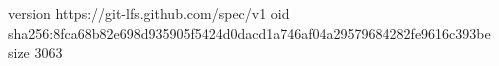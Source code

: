 version https://git-lfs.github.com/spec/v1
oid sha256:8fca68b82e698d935905f5424d0dacd1a746af04a29579684282fe9616c393be
size 3063
